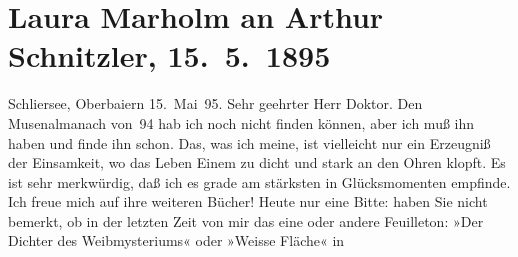 

         
         \renewcommand{\erwaehntePersonen}{Personen: Jules-Amédée Barbey d’Aurevilly, Laura Marholm}
         \renewcommand{\erwaehnteOrte}{Orte: Oberbayern, Schliersee, Wien}
         \renewcommand{\erwaehnteWerke}{Werke: Der Dichter des Weibmysteriums, Die Zukunft, Moderner Musen-Almanach auf das Jahr 1894. Ein Jahrbuch deutscher Kunst, Neue Freie Presse, Weiße Fläche, Wir Frauen und unsere Dichter}
               \section[Laura Marholm an Arthur Schnitzler, 15. 5. 1895]{ Laura Marholm an Arthur Schnitzler, 15. 5. 1895}\nopagebreak{}\rehead{ }\begin{ledgroupsized}[t]{13cm}\normalsize\beginnumbering \toendnotes[C]{\smallbreak\pagebreak[2]} 
\toendnotes[C]{\smallbreak}\pstart
           \noindent{}\raggedleft{}{\pb}Schliersee, Oberbaiern\pend
           \pstart
           \raggedleft{}15. Mai 95.\pend
           \pstart{}Sehr geehrter Herr Doktor.\pend\pstart
           Den Musenalmanach von 94 hab ich noch nicht
               finden können, aber ich muß ihn haben und finde ihn schon. Das, was ich meine, ist
               vielleicht nur ein Erzeugniß der Einsamkeit, wo das Leben Einem zu dicht und stark an
               den Ohren klopft. Es ist sehr merkwürdig, daß ich es grade am stärksten in
               Glücksmomenten empfinde.\pend
           \pstart
           Ich freue mich auf ihre weiteren Bücher!\pend
           \pstart
           Heute nur eine Bitte: haben Sie nicht bemerkt, ob in der letzten Zeit von mir das
               eine oder andere Feuilleton: »Der Dichter des
                  Weibmysteriums« oder »Weisse Fläche« in

\end{ledgroupsized}

